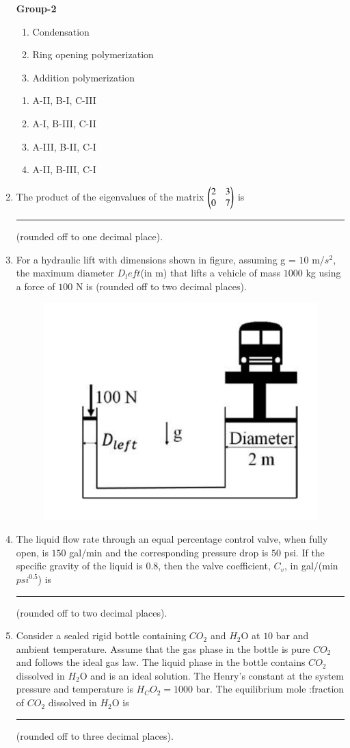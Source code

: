 \documentclass[journal]{IEEEtran}
\begin{document}
\begin{enumerate}
\begin{multicols}{2}
    \textbf{Group-2}
    \begin{enumerate}[label=(\Roman*)]
        \item Condensation
        \item Ring opening polymerization
        \item Addition polymerization
    \end{enumerate}
\end{multicols}
\begin{multicols}{2}
    \begin{enumerate}
        \item A-II, B-I, C-III
        \item A-I, B-III, C-II
        \item A-III, B-II, C-I
        \item A-II, B-III, C-I
    \end{enumerate}
\end{multicols}
\bigskip
    \item The product of the eigenvalues of the matrix  $\begin{pmatrix}
            2 & 3 \\
            0 & 7
        \end{pmatrix}$ is \rule{2cm}{0.1mm} (rounded off to one decimal place).
\newpage
    \item For a hydraulic lift with dimensions shown in figure, assuming g = $10$ m/$s^2$, the maximum diameter $D_left$(in m) that lifts a vehicle of mass $1000$ kg using a force of $100$ N is (rounded off to two decimal places).
    \begin{figure}[h!]
        \centering
        \includegraphics[width=0.4\linewidth]{Fig/23.png}

    \end{figure}

\item The liquid flow rate through an equal percentage control valve, when fully open, is $150$ gal/min and the corresponding pressure drop is $50$ psi. If the specific gravity of the liquid is $0.8$, then the valve coefficient, $C_v$, in gal/(min $psi^{0.5}$) is  \rule{1cm}{0.1mm} (rounded off to two decimal places).
\bigskip
    \item Consider a sealed rigid bottle containing $CO_2$ and $H_2$O at $10$ bar and ambient temperature. Assume that the gas phase in the bottle is pure $CO_2$ and follows the ideal gas law. The liquid phase in the bottle contains $CO_2$ dissolved in $H_2$O and is an ideal solution. The Henry's constant at the system pressure and temperature is $H_CO_2 = 1000$ bar. The equilibrium mole :fraction of $CO_2$ dissolved in $H_2$O is \rule{1cm}{0.1mm} (rounded off to three decimal places).   
\newpage

\end{enumerate}
\end{document}
